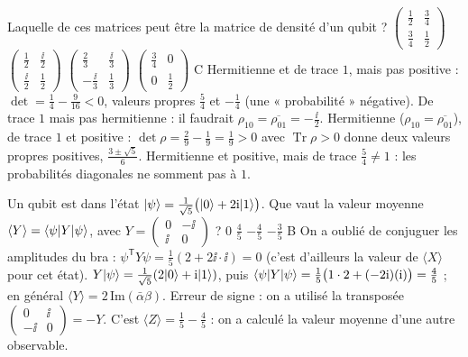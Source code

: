   {Laquelle de ces matrices peut être la matrice de densité d'un qubit ?}
  {$\begin{pmatrix}\frac12&\frac34\\\frac34&\frac12\end{pmatrix}$}
  {$\begin{pmatrix}\frac12&\frac{\ii}{2}\\\frac{\ii}{2}&\frac12\end{pmatrix}$}
  {$\begin{pmatrix}\frac23&\frac{\ii}{3}\\-\frac{\ii}{3}&\frac13\end{pmatrix}$}
  {$\begin{pmatrix}\frac34&0\\0&\frac12\end{pmatrix}$}
  {C}
\qcmx
  {Hermitienne et de trace $1$, mais pas positive : $\det=\frac14-\frac9{16}<0$, valeurs propres $\frac54$ et $-\frac14$ (une « probabilité » négative).}
  {De trace $1$ mais pas hermitienne : il faudrait $\rho_{10}=\overline{\rho_{01}}=-\frac{\ii}{2}$.}
  {Hermitienne ($\rho_{10}=\overline{\rho_{01}}$), de trace $1$ et positive : $\det\rho=\frac29-\frac19=\frac19>0$ avec $\operatorname{Tr}\rho>0$ donne deux valeurs propres positives, $\frac{3\pm\sqrt5}{6}$.}
  {Hermitienne et positive, mais de trace $\frac54\neq1$ : les probabilités diagonales ne somment pas à $1$.}

  {Un qubit est dans l'état $|\psi\rangle=\frac{1}{\sqrt5}\big(|0\rangle+2\mathrm{i}|1\rangle\big)$. Que vaut la valeur moyenne $\langle Y\rangle=\langle \psi|Y|\psi\rangle$, avec $Y=\begin{pmatrix}0&-\ii\\\ii&0\end{pmatrix}$ ?}
  {$0$}
  {$\frac45$}
  {$-\frac45$}
  {$-\frac35$}
  {B}
\qcmx
  {On a oublié de conjuguer les amplitudes du bra : $\psi^{\mathsf T}Y\psi=\frac15(2+2\ii\cdot\ii)=0$ (c'est d'ailleurs la valeur de $\langle X\rangle$ pour cet état).}
  {$Y|\psi\rangle=\frac1{\sqrt5}(2|0\rangle+\mathrm{i}|1\rangle)$, puis $\langle \psi| Y|\psi\rangle=\frac15\big(1\cdot2+(-2\mathrm{i})(\mathrm{i})\big)=\frac45$ ; en général $\langle Y\rangle=2\,\mathrm{Im}(\bar\alpha\beta)$.}
  {Erreur de signe : on a utilisé la transposée $\begin{pmatrix}0&\ii\\-\ii&0\end{pmatrix}=-Y$.}
  {C'est $\langle Z\rangle=\frac15-\frac45$ : on a calculé la valeur moyenne d'une autre observable.}

